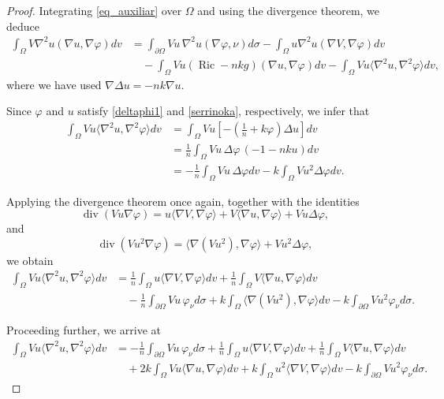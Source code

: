\documentclass[reqno,11pt]{amsart}
\numberwithin{equation}{section}  %
\begin{document}
\begin{proof}
Integrating \eqref{eq_auxiliar} over \(\Omega\) and using the divergence theorem, we deduce
\begin{align}\label{eq47}
\int_{\Omega}V\nabla^{2}u(\nabla u,\nabla\varphi)dv
&=
\int_{\partial\Omega}Vu\,\nabla^{2}u(\nabla\varphi,\nu)d\sigma
-
\int_{\Omega}u\nabla^{2}u(\nabla V,\nabla\varphi)dv
\nonumber\\
&\quad
-
\int_{\Omega}Vu(\operatorname{Ric}-nkg)(\nabla u,\nabla\varphi)dv
-
\int_{\Omega}Vu\langle\nabla^{2}u,\nabla^{2}\varphi\rangle dv,
\end{align}
where we have used \(\nabla\Delta u=-nk\nabla u\).

Since \(\varphi\) and \(u\) satisfy \eqref{deltaphi1} and \eqref{serrinoka}, respectively, we infer that
\begin{align}
\int_{\Omega}Vu\langle\nabla^{2}u,\nabla^{2}\varphi\rangle dv
&=
\int_{\Omega}Vu\left[-\left(\frac{1}{n}+k\varphi\right)\Delta u\right]dv
\nonumber\\
&=
\frac{1}{n}\int_{\Omega}Vu\,\Delta\varphi\,(-1-nku)dv
\nonumber\\
&=
-\frac{1}{n}\int_{\Omega}Vu\,\Delta\varphi dv
-k\int_{\Omega}Vu^{2}\Delta\varphi dv.
\nonumber
\end{align}

Applying the divergence theorem once again, together with the identities
\[
\operatorname{div}(Vu\nabla\varphi)
=
u\langle\nabla V,\nabla\varphi\rangle
+
V\langle\nabla u,\nabla\varphi\rangle
+
Vu\Delta\varphi,
\]
and
\[
\operatorname{div}(Vu^{2}\nabla\varphi)
=
\langle\nabla(Vu^{2}),\nabla\varphi\rangle
+
Vu^{2}\Delta\varphi,
\]
we obtain
\begin{align}
\int_{\Omega}Vu\langle\nabla^{2}u,\nabla^{2}\varphi\rangle dv
&=
\frac{1}{n}\int_{\Omega}u\langle\nabla V,\nabla\varphi\rangle dv
+
\frac{1}{n}\int_{\Omega}V\langle\nabla u,\nabla\varphi\rangle dv
\nonumber\\
&\quad
-
\frac{1}{n}\int_{\partial\Omega}Vu\,\varphi_{\nu}d\sigma
+
k\int_{\Omega}\langle\nabla(Vu^{2}),\nabla\varphi\rangle dv
-
k\int_{\partial\Omega}Vu^{2}\varphi_{\nu}d\sigma.
\nonumber
\end{align}

Proceeding further, we arrive at
\begin{align}\label{eq48}
\int_{\Omega}Vu\langle\nabla^{2}u,\nabla^{2}\varphi\rangle dv
&=
-\frac{1}{n}\int_{\partial\Omega}Vu\,\varphi_{\nu}d\sigma
+
\frac{1}{n}\int_{\Omega}u\langle\nabla V,\nabla\varphi\rangle dv
+
\frac{1}{n}\int_{\Omega}V\langle\nabla u,\nabla\varphi\rangle dv
\nonumber\\
&\quad
+
2k\int_{\Omega}Vu\langle\nabla u,\nabla\varphi\rangle dv
+
k\int_{\Omega}u^{2}\langle\nabla V,\nabla\varphi\rangle dv
-
k\int_{\partial\Omega}Vu^{2}\varphi_{\nu}d\sigma.
\end{align}


\end{proof}
\end{document}
